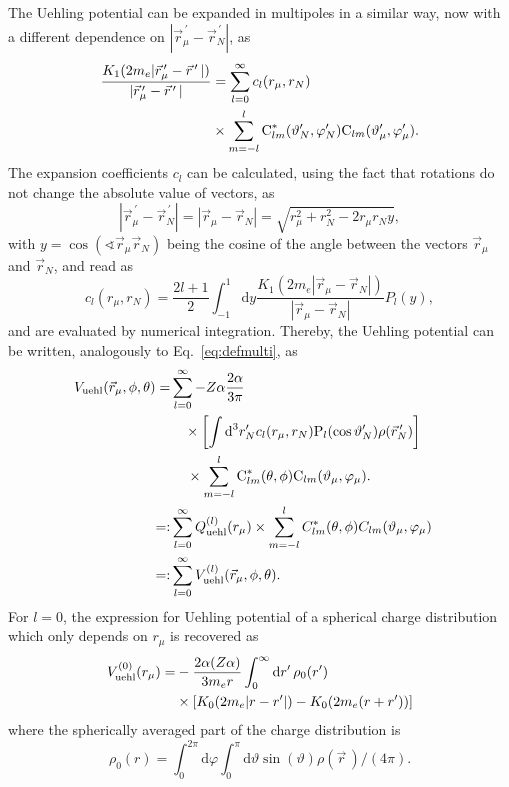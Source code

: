 The Uehling potential can be expanded in multipoles in a similar way, now with a different dependence on $|\vec{r}_\mu^{\,\prime}-\vec{r}_N^{\,\prime}|$, as
\begin{align}
\frac{K_1(2m_e{|\vec{r}_\mu^{\,\prime} - \vec{r}^{\,\prime}\,|})}{|\vec{r}_\mu^{\,\prime} - \vec{r}^{\,\prime}\,|}
&=\sum_{l=0}^\infty c_l(r_\mu,r_N)\\
&\times\sum_{m=-l}^l \text{C}^*_{lm}(\vartheta_N^{\prime},\varphi_N^{\prime})\text{C}_{lm}(\vartheta_\mu^\prime,\varphi_\mu^\prime).\notag
\end{align}
The expansion coefficients $c_l$ can be calculated, using the fact that rotations do not change the absolute value of vectors, as
\begin{equation}
|\vec{r}_\mu^{\,\prime} - \vec{r}_N^{\,\prime}|
=|\vec{r}_\mu - \vec{r}_N|
=\sqrt{r_\mu^2 + r_N^2 - 2 r_\mu r_N y},
\end{equation}
with ${y}{=}{\cos(\sphericalangle \vec{r}_\mu\vec{r}_N)}$ being the cosine of the angle between the vectors $\vec{r}_\mu$ and $\vec{r}_N$, and read as
\begin{equation}
c_l(r_\mu,r_N)=\frac{2l+1}{2} \int_{-1}^1 \text{d}y \frac{K_1(2m_e{|\vec{r}_\mu - \vec{r}_N|})}{|\vec{r}_\mu - \vec{r}_N|} P_l(y),
\label{eq:defcl}
\end{equation}
and are evaluated by numerical integration.
Thereby, the Uehling potential can be written, analogously to Eq.~\eqref{eq:defmulti}, as
\begin{align}
V_{\text{uehl}}(\vec{r}_\mu,\phi,\theta)=&\sum_{l=0}^\infty-Z\alpha\frac{2\alpha}{3\pi} \notag\\
&\quad\times\left[ \int \text{d}^3r^{\prime}_N c_l(r_\mu,r_N)\text{P}_{l}(\cos \vartheta_N^{\prime})\rho(\vec{r}_N^{\,\prime})\right]\notag\\
&\quad\,\times \sum_{m=-l}^l \text{C}^*_{lm}(\theta,\phi)\text{C}_{lm}(\vartheta_\mu,\varphi_\mu).\notag\\
=:&\sum_{l=0}^\infty Q^{(l)}_{\text{uehl}}(r_\mu)\times\sum_{m=-l}^lC^*_{lm}(\theta,\phi)C_{lm}(\vartheta_\mu,\varphi_\mu)&\notag\\
=:& \sum_{l=0}^\infty V^{(l)}_{\text{uehl}}(\vec{r}_\mu,\phi,\theta).
\label{eq:defmultiuehl}
\end{align}
For $l=0$, the expression for Uehling potential of a spherical charge distribution~\cite{Fullerton1976} which only depends on $r_\mu$ is recovered as
\begin{align}
\label{eq:sph_uehl}
V^{(0)}_{\text{uehl}}(r_\mu)=& -\frac{2\alpha (Z\alpha)}{3 m_e r}\int_0^\infty \text{d}r^{\prime}\,\rho_0(r^\prime)\\
&\times\left[K_0(2m_e|r-r^\prime|)-K_0(2m_e(r+r^\prime))\right]\notag
\end{align}
where the spherically averaged part of the charge distribution is
\begin{equation}
\rho_0(r)=\int_0^{2\pi}\text{d}\varphi\int_0^\pi\text{d}\vartheta \sin(\vartheta)\rho(\vec{r}\,)/(4\pi).
\end{equation}
%
%
